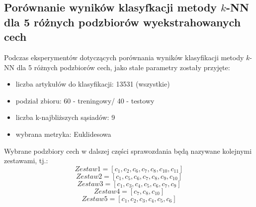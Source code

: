 \documentclass{classrep}
\begin{document}
\subsection{Porównanie wyników klasyfkacji metody $k$-NN dla 5 różnych podzbiorów wyekstrahowanych cech}
Podczas eksperymentów dotyczących porównania wyników klasyfikacji metody $k$-NN dla 5 różnych podzbiorów cech, jako stałe parametry zostały przyjęte:
\begin{itemize}
    \item liczba artykułów do klasyfikacji: 13531 (wszystkie)
    \item podział zbioru: 60 - treningowy/ 40 - testowy    
    \item liczba k-najbliższych sąsiadów: 9 
    \item wybrana metryka: Euklidesowa
\end{itemize}
Wybrane podzbiory cech w dalszej części sprawozdania będą nazywane kolejnymi zestawami, tj.:
\begin{equation}
   Zestaw1 = [c_{1}, c_{2}, c_{6}, c_{7}, c_{8}, c_{10}, c_{11}]
\end{equation}
\begin{equation}
   Zestaw2 = [c_{1}, c_{5}, c_{6}, c_{7}, c_{8}, c_{9}, c_{10}]
\end{equation}
\begin{equation}
   Zestaw3 = [c_{1}, c_{3}, c_{4}, c_{5}, c_{6}, c_{7}, c_{9}]
\end{equation}
\begin{equation}
   Zestaw4 = [c_{7}, c_{8}, c_{10}]
\end{equation}
\begin{equation}
   Zestaw5 = [c_{1}, c_{2}, c_{3}, c_{4}, c_{5}, c_{6}]
\end{equation}
\end{document}

